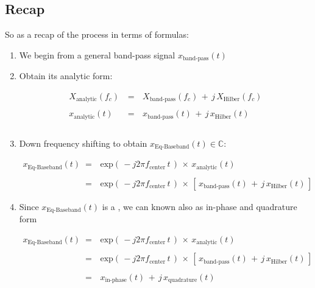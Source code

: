 \documentclass[12pt,a4paper]{book}
\begin{document}
\subsection{Recap}

So as a recap of the process in terms of formulas:

\begin{enumerate}

\item We begin from a general band-pass signal $x_{\text{band-pass}}(t)$

\item Obtain its analytic form:

\begin{equation}
\begin{array}{rcl}
X_{\text{analytic}}(f_c) \, &=& \, X_{\text{band-pass}}(f_c) \, + \, j \, X_{\text{Hilber}}(f_c) \\ \\
x_{\text{analytic}}(t) \, &=& \, x_{\text{band-pass}}(t) \, + \, j \, x_{\text{Hilber}}(t) \\ \\
\end{array}
\end{equation}

\item Down frequency shifting to obtain $x_{\text{Eq-Baseband}}(t) \in \mathbb{C}$:

\begin{equation}
\begin{array}{rcl}
x_{\text{Eq-Baseband}}(t) \, &=& \, \text{exp}\left(\, -j 2 \pi f_{\text{center}} \, t \,\right) \, \times \, x_{\text{analytic}}(t) \\ \\
	&=& \, \text{exp}\left(\, -j 2 \pi f_{\text{center}} \, t \,\right) \, \times \, \left[\,  x_{\text{band-pass}}(t) \, + \, j \, x_{\text{Hilber}}(t) \,\right]
\end{array}
\end{equation}

\item Since  $x_{\text{Eq-Baseband}}(t)$ is a , we can  known also as in-phase and quadrature form

\begin{equation}
\begin{array}{rcl}
x_{\text{Eq-Baseband}}(t) \, &=& \, \text{exp}\left(\, -j 2 \pi f_{\text{center}} \, t \,\right) \, \times \, x_{\text{analytic}}(t) \\ \\
	&=& \, \text{exp}\left(\, -j 2 \pi f_{\text{center}} \, t \,\right) \, \times \, \left[\,  x_{\text{band-pass}}(t) \, + \, j \, x_{\text{Hilber}}(t) \,\right] \\ \\
	&=& \, x_{\text{in-phase}}(t) \, + \, j \, x_{\text{quadrature}}(t)
\end{array}
\end{equation}


\end{enumerate}
\end{document}
